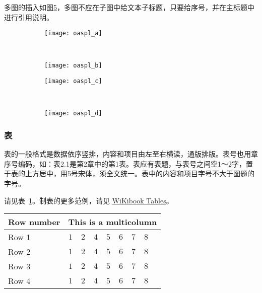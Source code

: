 多图的插入如图\ref{fig:oaspl}，多图不应在子图中给文本子标题，只要给序号，并在主标题中进行引用说明。
\begin{figure}[!htbp]
    \centering
    \begin{subfigure}[b]{0.35\textwidth}
      \texttt{[image: oaspl\_a]}
      \caption{}
      \label{fig:oaspl_a}
    \end{subfigure}%
    ~%
    \begin{subfigure}[b]{0.35\textwidth}
      \texttt{[image: oaspl\_b]}
      \caption{}
      \label{fig:oaspl_b}
    \end{subfigure}
    \begin{subfigure}[b]{0.35\textwidth}
      \texttt{[image: oaspl\_c]}
      \caption{}
      \label{fig:oaspl_c}
    \end{subfigure}%
    ~%
    \begin{subfigure}[b]{0.35\textwidth}
      \texttt{[image: oaspl\_d]}
      \caption{}
      \label{fig:oaspl_d}
    \end{subfigure}
    \label{fig:oaspl}
\end{figure}

\subsubsection{表}
表的一般格式是数据依序竖排，内容和项目由左至右横读，通版排版。表号也用章序号编码，如：表2.1是第2章中的第1表。表应有表题，与表号之间空1～2字，置于表的上方居中，用5号宋体，须全文统一。表中的内容和项目字号不大于图题的字号。

请见表~\ref{tab:sample}。制表的更多范例，请见 \href{https://en.wikibooks.org/wiki/LaTeX/Tables}{WiKibook Tables}。
\begin{table}[!htbp]
    \label{tab:sample}
    \centering
    \footnotesize%
    \setlength{\tabcolsep}{4pt}%
    \renewcommand{\arraystretch}{1.2}%
    \begin{tabular}{lcccccccc}
        \hline
        Row number & \multicolumn{8}{c}{This is a multicolumn} \\
        \hline
        Row 1 & $1$ & $2$ & $4$ & $5$ & $6$ & $7$ & $8$\\
        Row 2 & $1$ & $2$ & $4$ & $5$ & $6$ & $7$ & $8$\\
        Row 3 & $1$ & $2$ & $4$ & $5$ & $6$ & $7$ & $8$\\
        Row 4 & $1$ & $2$ & $4$ & $5$ & $6$ & $7$ & $8$\\
        \hline
    \end{tabular}
\end{table}


